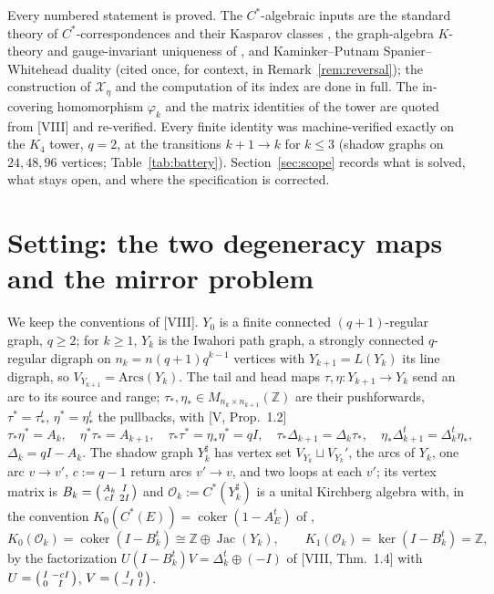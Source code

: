 \documentclass[11pt]{amsart}
\numberwithin{equation}{section}
\theoremstyle{definition}
\theoremstyle{remark}
\newcommand{\Z}{\mathbb{Z}}
\newcommand{\cO}{\mathcal{O}}
\newcommand{\cX}{\mathcal{X}}
\newcommand{\Jac}{\operatorname{Jac}}
\newcommand{\coker}{\operatorname{coker}}
\newcommand{\ta}{\tau_*}
\newcommand{\taup}{\tau^*}
\newcommand{\et}{\eta_*}
\newcommand{\etp}{\eta^*}
\newcommand{\Ysh}[1]{Y_{#1}^{\sharp}}
\begin{document}
Every numbered statement is proved. The $C^*$-algebraic inputs are the standard theory of
$C^*$-correspondences and their Kasparov classes \cite{Kas,Bla}, the graph-algebra
$K$-theory and gauge-invariant uniqueness of \cite{R}, and Kaminker--Putnam
Spanier--Whitehead duality \cite{KP} (cited once, for context, in
Remark~\ref{rem:reversal}); the construction of $\cX_\eta$ and the computation of its index
are done in full. The in-covering homomorphism $\varphi_k$ and the matrix identities of
the tower are quoted from [VIII] and re-verified. Every finite identity was
machine-verified exactly on the $K_4$ tower, $q=2$, at the transitions
$k+1\to k$ for $k\le3$ (shadow graphs on $24,48,96$ vertices; Table~\ref{tab:battery}).
Section~\ref{sec:scope} records what is solved, what stays open, and where the
specification is corrected.

\section{Setting: the two degeneracy maps and the mirror problem}\label{sec:setting}

We keep the conventions of [VIII]. $Y_0$ is a finite connected $(q{+}1)$-regular graph,
$q\ge2$; for $k\ge1$, $Y_k$ is the Iwahori path graph, a strongly connected $q$-regular
digraph on $n_k=n(q{+}1)q^{k-1}$ vertices with $Y_{k+1}=L(Y_k)$ its line digraph, so
$V_{Y_{k+1}}=\mathrm{Arcs}(Y_k)$. The tail and head maps $\tau,\eta\colon Y_{k+1}\to Y_k$
send an arc to its source and range; $\ta,\et\in M_{n_k\times n_{k+1}}(\Z)$ are their
pushforwards, $\taup=\ta^{t}$, $\etp=\et^{t}$ the pullbacks, with [V, Prop.~1.2]
\begin{equation}\label{eq:calc}
\ta\etp=A_k,\quad \etp\ta=A_{k+1},\quad \ta\taup=\et\etp=qI,\quad
\ta\Delta_{k+1}=\Delta_k\ta,\quad \et\Delta_{k+1}^{t}=\Delta_k^{t}\et,
\end{equation}
$\Delta_k=qI-A_k$. The shadow graph $\Ysh{k}$ has vertex set $V_{Y_k}\sqcup V_{Y_k}'$,
the arcs of $Y_k$, one arc $v\to v'$, $c:=q-1$ return arcs $v'\to v$, and two loops at
each $v'$; its vertex matrix is $B_k=\begin{psmallmatrix}A_k&I\\cI&2I\end{psmallmatrix}$
and $\cO_k:=C^*(\Ysh{k})$ is a unital Kirchberg algebra with, in the convention
$K_0(C^*(E))=\coker(1-A_E^{t})$ of \cite[Thm.~7.16]{R},
\begin{equation}\label{eq:ktheory}
K_0(\cO_k)=\coker(I-B_k^{t})\cong\Z\oplus\Jac(Y_k),\qquad K_1(\cO_k)=\ker(I-B_k^{t})=\Z ,
\end{equation}
by the factorization $U(I-B_k^{t})V=\Delta_k^{t}\oplus(-I)$ of [VIII, Thm.~1.4] with
$U=\begin{psmallmatrix}I&-cI\\0&I\end{psmallmatrix}$,
$V=\begin{psmallmatrix}I&0\\-I&I\end{psmallmatrix}$.
\end{document}
